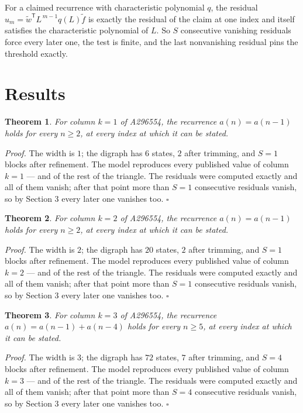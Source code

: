 \documentclass[11pt]{article}
\newtheorem{theorem}{Theorem}
\theoremstyle{definition}
\begin{document}
For a claimed recurrence with characteristic polynomial $q$, the residual $u_m = \tilde w^{\mathsf T}L^{\,m-1}q(L)\tilde f$ is exactly the residual of the claim at one index and itself satisfies the characteristic polynomial of $L$. So $S$ consecutive vanishing residuals force every later one, the test is finite, and the last nonvanishing residual pins the threshold exactly.

\section{Results}

\begin{theorem} For column $k = 1$ of A296554, the recurrence $a(n) = a(n-1)$ holds for every $n \ge 2$, at every index at which it can be stated.\end{theorem}

{\itshape Proof.} The width is $1$; the digraph has $6$ states, $2$ after trimming, and $S = 1$ blocks after refinement. The model reproduces every published value of column $k = 1$ --- and of the rest of the triangle. The residuals were computed exactly and all of them vanish; after that point more than $S = 1$ consecutive residuals vanish, so by Section 3 every later one vanishes too. $\square$

\begin{theorem} For column $k = 2$ of A296554, the recurrence $a(n) = a(n-1)$ holds for every $n \ge 2$, at every index at which it can be stated.\end{theorem}

{\itshape Proof.} The width is $2$; the digraph has $20$ states, $2$ after trimming, and $S = 1$ blocks after refinement. The model reproduces every published value of column $k = 2$ --- and of the rest of the triangle. The residuals were computed exactly and all of them vanish; after that point more than $S = 1$ consecutive residuals vanish, so by Section 3 every later one vanishes too. $\square$

\begin{theorem} For column $k = 3$ of A296554, the recurrence $a(n) = a(n-1) + a(n-4)$ holds for every $n \ge 5$, at every index at which it can be stated.\end{theorem}

{\itshape Proof.} The width is $3$; the digraph has $72$ states, $7$ after trimming, and $S = 4$ blocks after refinement. The model reproduces every published value of column $k = 3$ --- and of the rest of the triangle. The residuals were computed exactly and all of them vanish; after that point more than $S = 4$ consecutive residuals vanish, so by Section 3 every later one vanishes too. $\square$
\end{document}
